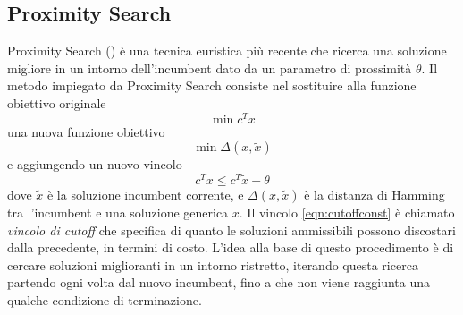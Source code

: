 
\subsection{Proximity Search}
Proximity Search (\citet*{fischetti2012proximity}) è una tecnica euristica più recente che ricerca una soluzione migliore in un intorno dell’incumbent dato da un parametro di prossimità $\theta$. Il metodo impiegato da Proximity Search consiste nel sostituire alla funzione obiettivo originale 
\begin{equation}
  \min c^Tx
\end{equation}
una nuova funzione obiettivo 
\begin{equation}
  \min\Delta(x, \tilde{x})
\end{equation}
e aggiungendo un nuovo vincolo
\begin{equation}
  c^Tx \leq c^T\tilde{x} - \theta \label{eqn:cutoffconst}
\end{equation}
dove $\tilde{x}$ è la soluzione incumbent corrente, e $\Delta(x, \tilde{x})$ è la distanza di Hamming tra l'incumbent e una soluzione generica $x$. Il vincolo \ref{eqn:cutoffconst} è chiamato \textit{vincolo di cutoff} che specifica di quanto le soluzioni ammissibili possono discostari dalla precedente, in termini di costo. L’idea alla base di questo procedimento è di cercare soluzioni miglioranti in un intorno ristretto, iterando questa ricerca partendo ogni volta dal nuovo incumbent, fino a che non viene raggiunta una qualche condizione di terminazione.

